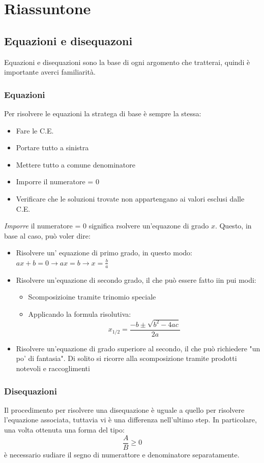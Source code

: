 \section{Riassuntone}
\subsection{Equazioni e disequazoni}
Equazioni e disequazioni sono la base di ogni argomento che tratterai, quindi è importante averci familiarità.
\subsubsection{Equazioni}
Per risolvere le equazioni la stratega di base è sempre la stessa:
\begin{itemize}
	\item Fare le C.E.
	\item Portare tutto a sinistra
	\item Mettere tutto a comune denominatore
	\item Imporre il numeratore = 0
	\item Verificare che le soluzioni trovate non appartengano ai valori esclusi dalle C.E.
\end{itemize}
\textit{Imporre} il numeratore = 0 significa rsolvere un'equazone di grado $ x $. Questo, in base al caso, può voler dire:
\begin{itemize}
	\item Risolvere un' equazione di primo grado, in questo modo:
	      $ ax + b = 0 \rightarrow ax = b \rightarrow x = \frac{b}{a} $
	\item Risolvere un'equazione di secondo grado, il che può essere fatto iin pui modi:
	      \begin{itemize}
		      \item Scomposizioine tramite trinomio speciale
		      \item Applicando la formula risolutiva:
		            \[
			            x_{1/2} = \frac{-b \pm \sqrt{b^2 - 4ac}}{2a}
		            \]
	      \end{itemize}
	\item Risolvere un'equazione di grado superiore al secondo, il che può richiedere "un po' di fantasia". Di solito si ricorre alla scomposizione tramite prodotti notevoli e raccoglimenti
\end{itemize}

\subsubsection{Disequazioni}
Il procedimento per risolvere una disequazione è uguale a quello per risolvere l'equazione associata, tuttavia vi è una differenza nell'ultimo step. In particolare, una volta ottenuta una forma del tipo:
\[
	\frac{A}{B} \ge 0
\]
è necessario sudiare il segno di numerattore e denominatore separatamente.

